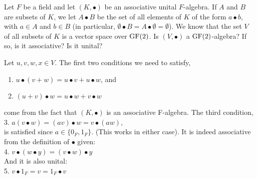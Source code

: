 \maketitle

\begin{ProbBox} %
\begin{problem}[Golan 124]
Let $F$ be a field and let $(K, \bullet)$ be an associative unital
$F$-algebra.  If $A$ and $B$ are subsets of $K$, we let $A\bullet B$ be the set
of all elements of $K$ of the form $a \bullet b$, with $a \in A$ and $b \in B$
(in particular, $\emptyset \bullet B = A \bullet \emptyset = \emptyset$).
We know that the set $V$ of all subsets of $K$ is a vector space over $\operatorname{GF}(2)$.
Is $(V, \bullet)$ a $\operatorname{GF}(2)$-algebra?  If so, is it associative?  Is it unital?
\end{problem}
\smallskip
\begin{solution}
Let $u,v,w,x \in V$. The first two conditions we need to satisfy, 
\begin{enumerate}
  \item $u \bullet (v+w) = u \bullet v + u \bullet w$, and
  \item $(u+v) \bullet w = u \bullet w + v \bullet w$ 
\end{enumerate}
come from the fact that $(K, \bullet)$ is an associative F-algebra. The third condition, \\
3. $a(v \bullet w) = (av) \bullet w = v \bullet (aw)$, \\
is satisfied since $a\in\{0_F,1_F\}$. (This works in either case). It is indeed associative from the definition of $\bullet$ given: \\
4. $v \bullet (w \bullet y) = (v \bullet w) \bullet y$ \\
And it is also unital: \\
5. $v \bullet 1_F = v = 1_F \bullet v$
\end{solution}
\end{ProbBox}
\probskip

